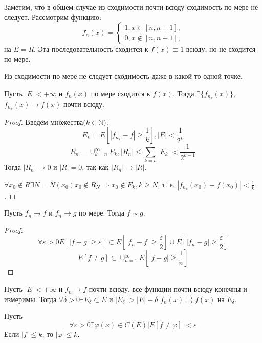 \documentclass[11pt]{article}
\newcounter{th}\setcounter{th}{0}
\def\th{\par\smallskip\refstepcounter{th}\textbf{\arabic{th}}}
\newtheorem*{Theorem}{Теорема \th}
\begin{document}
Заметим, что в общем случае из сходимости почти всюду сходимость по мере не следует. Рассмотрим
функцию:
\begin{equation}
f_n(x) = \begin{cases}
1, x \in [n, n + 1],\\
0, x \notin [n, n + 1],
\end{cases}
\end{equation}
на $E = R$. Эта последовательность сходится к $f(x) \equiv 1$ всюду, но не сходится по мере.

Из сходимости по мере не следует сходимость даже в какой-то одной точке.
\begin{Theorem}
Пусть $|E| < +\infty$ и $f_n(x)$ по мере сходится к $f(x)$. Тогда $\exists\{f_{n_k}(x)\}$,
$f_{n_k}(x) \to f(x)$ почти всюду.
\end{Theorem}
\begin{proof}
Введём множества($k \in \mathbb{N}$):
\begin{equation}
E_k = E[|f_{n_k} - f| \geq \frac1k], |E| < \frac1{2^k}
\end{equation}
\begin{equation}
R_n = \cup_{k = n}^{\infty}E_k, |R_n| \leq \sum_{k = n}|E_k| < \frac1{2^{k - 1}}
\end{equation}
Тогда $|R_n| \to 0$ и $|R| = 0$, так как $|R_n| \to |R|$.

$\forall x_0 \notin R \exists N = N(x_0) x_0 \notin R_N \Rightarrow x_0 \notin E_k, k \geq N$,
т. е. $|f_{n_k}(x_0) - f(x_0)| < \frac{1}k$.
\end{proof}
\begin{Theorem}
Пусть $f_n \to f$ и $f_n \to g$ по мере. Тогда $f \sim g$.
\end{Theorem}
\begin{proof}
\begin{equation}
\forall \varepsilon > 0 E[|f - g| \geq \varepsilon] \subset E\left[|f_n - f| \geq \frac{\varepsilon}2\right]
\cup E\left[|f_n - g| \geq \frac{\varepsilon}2\right]
\end{equation}
\begin{equation}
E[f \neq g] \subset \cup_{n = 1}^{\infty}E\left[|f - g| \geq \frac1n\right]
\end{equation}
\end{proof}
\begin{Theorem}
Пусть $|E| < +\infty$ и $f_n \to f$ почти всюду, все функции почти всюду конечны и измеримы.
Тогда $\forall\delta > 0 \exists E_{\delta} \subset E$ и $|E_{\delta}| > |E| - \delta$
$f_n(x) \rightrightarrows f(x)$ на $E_{\delta}$.
\end{Theorem}
\begin{Theorem}
Пусть
\begin{equation}
\forall\varepsilon > 0 \exists \varphi(x) \in C(E) |E[f \neq \varphi]| < \varepsilon
\end{equation}
Если $|f| \leq k$, то $|\varphi| \leq k$.
\end{Theorem}
\end{document}
